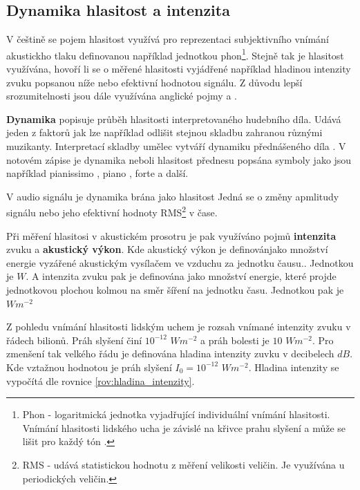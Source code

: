   \subsection{Dynamika hlasitost a intenzita} \label{sec:Dynamika}
  
  V češtině se pojem hlasitost využívá pro reprezentaci subjektivního vnímání akustickho tlaku definovanou například jednotkou phon\footnote{Phon - logaritmická jednotka vyjadřující individuální vnímání hlasitosti. Vnímání hlasitosti lidského ucha je závislé na křivce prahu slyšení a může se lišit pro každý tón \cite{tumarkin_1950}.}. 
  Stejně tak je hlasitost využívána, hovoří li se o měřené hlasitosti vyjádřené například hladinou intenzity zvuku popsanou níže nebo efektivní hodnotou signálu.
  Z důvodu lepší srozumitelnosti jsou dále využívána anglické pojmy  a . 

  \textbf{Dynamika} popisuje průběh hlasitosti interpretovaného hudebního díla. Udává jeden z faktorů jak lze například odlišit stejnou skladbu zahranou různými muzikanty. Interpretací skladby umělec vytváří dynamiku přednášeného díla \cite{fundamental_of_music_processing}.
  V notovém zápise je dynamika neboli hlasitost přednesu popsána symboly jako jsou například pianissimo , piano , forte  a další.

  V audio signálu je dynamika brána jako hlasitost  Jedná se o změny apmlitudy signálu nebo jeho efektivní hodnoty \acs{RMS}\footnote{RMS - udává statistickou hodnotu z měření velikosti veličin. Je využívána u periodických veličin\cite{RMS_value}.} v čase.

  Při měření hlasitosi  v akustickém prosotru je pak využíváno pojmů \textbf{intenzita} zvuku a \textbf{akustický výkon}.
  Kde akustický výkon je definovánjako množství energie  vyzářené akustickým vysílačem ve vzduchu za jednotku čausu.\cite{acoustic_power}. Jednotkou je $W$.
  A intenzita zvuku pak je definována jako množství energie, které projde jednotkovou plochou kolmou na směr šíření na jednotku času. Jednotkou pak je $Wm^{-2}$ \cite{intenzita_zvuku_definice}
  
  Z pohledu vnímání hlasitosti lidským uchem je rozsah vnímané intenzity zvuku v řádech bilionů. Práh slyšení činí $10^{-12}$ $Wm^{-2}$ a práh bolesti je $10$ $Wm^{-2}$.
  Pro zmenšení tak velkého řádu je definována hladina intenzity zuvku v decibelech $dB$. Kde vztažnou hodnotou je práh slyšení $I_0 = 10^{-12}$ $Wm^{-2}$.
  Hladina intenzity se vypočítá dle rovnice \ref{rov:hladina_intenzity}.

